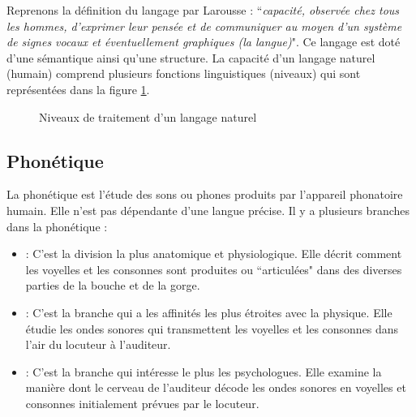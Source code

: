 \documentclass{KodeBook}
\begin{document}
Reprenons la définition du langage par Larousse : ``\textit{capacité, observée chez tous les hommes, d'exprimer leur pensée et de communiquer au moyen d'un système de signes vocaux et éventuellement graphiques (la langue)}".
Ce langage est doté d'une sémantique ainsi qu'une structure. 
La capacité d'un langage naturel (humain) comprend plusieurs fonctions linguistiques (niveaux) qui sont représentées dans la figure \ref{fig:niveaux}.

\begin{figure}[!ht]
	\centering 
	\caption{Niveaux de traitement d'un langage naturel}
	\label{fig:niveaux}
\end{figure}

\subsection{Phonétique}

La phonétique est l'étude des sons ou phones produits par l'appareil phonatoire humain.
Elle n'est pas dépendante d'une langue précise. 
Il y a plusieurs branches dans la phonétique :
\begin{itemize}
	\item {} :  C'est la division la plus anatomique et physiologique. 
	Elle décrit comment les voyelles et les consonnes sont produites ou ``articulées" dans des diverses parties de la bouche et de la gorge.
	\item {} : C'est la branche qui a les affinités les plus étroites avec la physique. 
	Elle étudie les ondes sonores qui transmettent les voyelles et les consonnes dans l'air du locuteur à l'auditeur.
	\item {} : C'est la branche qui intéresse le plus les psychologues. 
	Elle examine la manière dont le cerveau de l'auditeur décode les ondes sonores en voyelles et consonnes initialement prévues par le locuteur.
\end{itemize}
\end{document}
